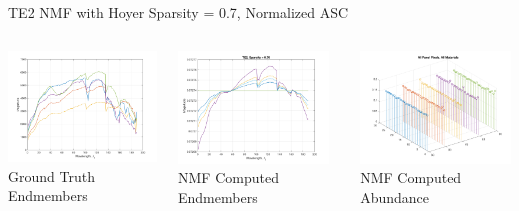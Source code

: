 \documentclass{beamer}
\begin{document}
\begin{frame}{TE2 NMF with Hoyer Sparsity = 0.7, Normalized  ASC}
\begin{columns}
    \begin{column}{0.33\textwidth}
        \includegraphics[width=4cm,center]{reflectance}
        \\ Ground Truth Endmembers
        \centering
    \end{column}
    \begin{column}{0.33\textwidth}
        \includegraphics[width=4cm,center]{nmf_endmembers_te2_70.png}
        \\ NMF Computed Endmembers
        \centering
    \end{column}
    \begin{column}{0.33\textwidth}
        \includegraphics[width=4cm,center]{nmf_abundance_te2_70_allmaterials.png}
        \\ NMF Computed Abundance
        \centering
    \end{column}
\end{columns}
\end{frame}
\end{document}
